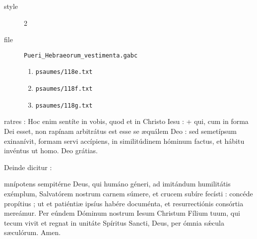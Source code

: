 




\begin{psaum}
\begin{description}
\item[style] 2
\item[file] \verb|Pueri_Hebraeorum_vestimenta.gabc|
\begin{enumerate}
\item  \verb|psaumes/118e.txt|
\item  \verb|psaumes/118f.txt|
\item  \verb|psaumes/118g.txt|
\end{enumerate}
\end{description}
\end{psaum}


\begin{lectio}
ratres : Hoc enim sent\'ite in vobis, quod et in Christo Iesu : + qui, cum in forma Dei esset, non rap\'inam arbitr\'atus est esse se {\ae}qu\'alem Deo :
sed semet\'ipsum exinan\'ivit, formam servi acc\'ipiens, \*
in similit\'udinem h\'ominum factus, et h\'abitu inv\'entus ut homo.
\R Deo gr\'atias.
\end{lectio}




\begin{rubric}
Deinde dicitur :
\end{rubric}



\begin{lectio}
mn\'ipotens sempit\'erne Deus, qui hum\'ano g\'eneri, ad imit\'andum humilit\'atis ex\'emplum, Salvat\'orem nostrum carnem s\'umere,
et crucem sub\'ire fec\'isti : conc\'ede prop\'itius ; ut et pati\'enti{\ae} ips\'ius hab\'ere docum\'enta,
et resurrecti\'onis cons\'ortia mere\'amur.
Per e\'undem D\'ominum nostrum Iesum Christum F\'ilium tuum,
qui tecum vivit et regnat in unit\'ate Sp\'iritus Sancti, Deus, per \'omnia s\'{\ae}cula s{\ae}cul\'orum.
\R Amen.
\end{lectio}

